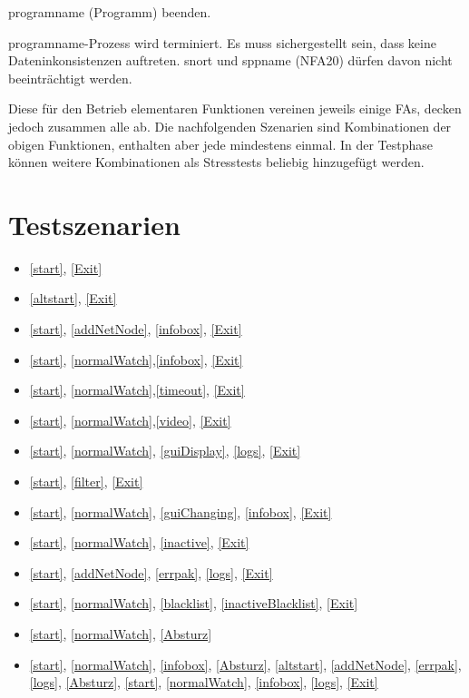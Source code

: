\begin{description}[style=multiline, leftmargin=4cm, labelwidth=4cm]
  \item[\namedlabel{Exit}{Exit}] \gls{programname} (Programm) beenden.
  
  \item[\namedlabel{Absturz}{Absturz}] \gls{programname}-Prozess wird terminiert. Es muss sichergestellt sein, dass keine Dateninkonsistenzen auftreten. \gls{snort} und \gls{sppname} (NFA20) dürfen davon nicht beeinträchtigt werden.

\end{description}
\par
Diese für den Betrieb elementaren Funktionen vereinen jeweils einige FAs, decken jedoch zusammen alle ab. Die nachfolgenden Szenarien sind Kombinationen der obigen Funktionen, enthalten aber jede mindestens einmal. In der Testphase können weitere Kombinationen als Stresstests beliebig hinzugefügt werden.

\section{Testszenarien}

\begin{itemize}
  \item \ref{start}, \ref{Exit}
  \item \ref{altstart}, \ref{Exit}
  \item \ref{start}, \ref{addNetNode}, \ref{infobox}, \ref{Exit}
  \item \ref{start}, \ref{normalWatch},\ref{infobox}, \ref{Exit}
  \item \ref{start}, \ref{normalWatch},\ref{timeout}, \ref{Exit}
  \item \ref{start}, \ref{normalWatch},\ref{video}, \ref{Exit}
  \item \ref{start}, \ref{normalWatch}, \ref{guiDisplay}, \ref{logs}, \ref{Exit}
  \item \ref{start}, \ref{filter}, \ref{Exit}
  \item \ref{start}, \ref{normalWatch}, \ref{guiChanging}, \ref{infobox}, \ref{Exit}
  \item \ref{start}, \ref{normalWatch}, \ref{inactive}, \ref{Exit}
  \item \ref{start}, \ref{addNetNode}, \ref{errpak}, \ref{logs}, \ref{Exit}
  \item \ref{start}, \ref{normalWatch}, \ref{blacklist}, \ref{inactiveBlacklist}, \ref{Exit}
  \item \ref{start}, \ref{normalWatch}, \ref{Absturz}
  \item \ref{start}, \ref{normalWatch}, \ref{infobox}, \ref{Absturz}, \ref{altstart}, \ref{addNetNode}, \ref{errpak}, \ref{logs}, \ref{Absturz}, \ref{start}, \ref{normalWatch}, \ref{infobox}, \ref{logs}, \ref{Exit}
\end{itemize}
